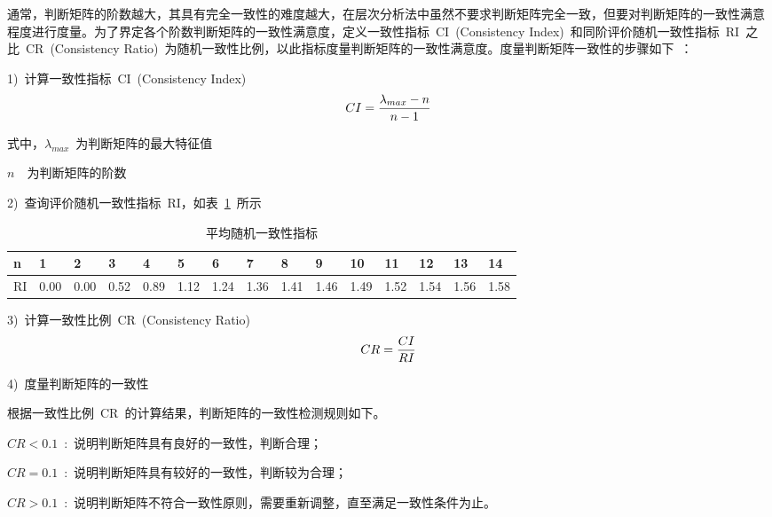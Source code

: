 通常，判断矩阵的阶数越大，其具有完全一致性的难度越大，在层次分析法中虽然不要求判断矩阵完全一致，但要对判断矩阵的一致性满意程度进行度量。为了界定各个阶数判断矩阵的一致性满意度，定义一致性指标~CI~(Consistency Index)~和同阶评价随机一致性指标~RI~之比~CR~(Consistency Ratio)~为随机一致性比例\cite{Deng2012AHP}，以此指标度量判断矩阵的一致性满意度。度量判断矩阵一致性的步骤如下~：

1)~计算一致性指标~CI~(Consistency Index)
\begin{equation}\label{equ:chap4:Index10}
    CI=\displaystyle\frac{\lambda_{max}-n}{n-1}
\end{equation}

式中，$\lambda_{max}$~为判断矩阵的最大特征值

\hspace{1.3cm}$n$~~为判断矩阵的阶数

2)~查询评价随机一致性指标~RI，如表~\ref{tab:chap4:consistency}~所示
\begin{table}[htb]
   \centering
   \caption{平均随机一致性指标}
   \label{tab:chap4:consistency}

     \begin{tabular}{p{0.54cm}<{\centering}p{0.54cm}<{\centering}p{0.54cm}<{\centering}p{0.54cm}<{\centering}p{0.54cm}<{\centering}p{0.54cm}<{\centering}p{0.54cm}<{\centering}p{0.54cm}<{\centering}p{0.54cm}<{\centering}p{0.54cm}<{\centering}p{0.54cm}<{\centering}p{0.54cm}<{\centering}p{0.54cm}<{\centering}p{0.54cm}<{\centering}p{0.54cm}<{\centering}}
\toprule
n     & 1  &2  &3  &4  &5  &6   &7  &8   &9  &10   &11  &12    &13  &14    \\
\midrule
RI   &0.00  &0.00  &0.52  &0.89  &1.12 &1.24  &1.36  &1.41  &1.46  &1.49   &1.52  &1.54   &1.56  &1.58 \\
\bottomrule
\end{tabular}
\end{table}

3)~计算一致性比例~CR~(Consistency Ratio)
\begin{equation}\label{equ:chap4:Index11}
    CR=\displaystyle\frac{CI}{RI}
\end{equation}

4)~度量判断矩阵的一致性

根据一致性比例~CR~的计算结果，判断矩阵的一致性检测规则如下。

$CR<0.1$~:~说明判断矩阵具有良好的一致性，判断合理；

$CR=0.1$~:~说明判断矩阵具有较好的一致性，判断较为合理；

$CR>0.1$~:~说明判断矩阵不符合一致性原则，需要重新调整，直至满足一致性条件为止。

